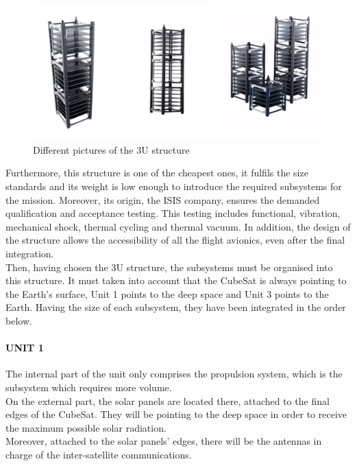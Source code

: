\begin{figure}[h!]
	\centering
	\includegraphics[scale=0.5]{img/structures_3u.png}
	\caption{Different pictures of the 3U structure}
	\label{fig:structures_3u}
\end{figure}

Furthermore, this structure is one of the cheapest ones, it fulfils the size
standards and its weight is low enough to introduce the required subsystems for
the mission. Moreover, its origin, the ISIS company, ensures the demanded
qualification and acceptance testing. This testing includes functional, vibration,
mechanical shock, thermal cycling and thermal vacuum. In addition, the design of
the structure allows the accessibility of all the flight avionics, even after
the final integration.\\

Then, having chosen the 3U structure, the subsystems must be organised into this
structure. It must taken into account that the CubeSat is always pointing to the
Earth’s surface, Unit 1 points to the deep space and Unit 3 points to the Earth.
Having the size of each subsystem, they have been integrated in the order below.\\

\paragraph{UNIT 1}
The internal part of the unit only comprises the propulsion system, which is the subsystem which requires more volume.\\
On the external part, the solar panels are located there, attached to the final edges of the CubeSat. They will be pointing to the deep space in order to receive the maximum possible solar radiation.\\
Moreover, attached to the solar panels’ edges, there will be the antennas in charge of the inter-satellite communications.\\

